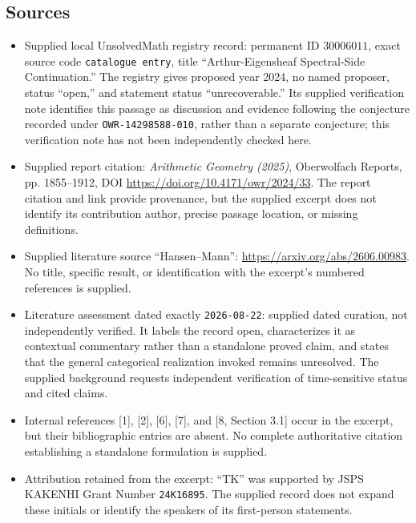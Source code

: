 \documentclass[11pt]{article}
\begin{document}
\subsection{Sources}
\begin{itemize}
\item Supplied local UnsolvedMath registry record: permanent ID \(30006011\), exact source code \texttt{catalogue entry}, title ``Arthur-Eigensheaf Spectral-Side Continuation.'' The registry gives proposed year 2024, no named proposer, status ``open,'' and statement status ``unrecoverable.'' Its supplied verification note identifies this passage as discussion and evidence following the conjecture recorded under \texttt{OWR-14298588-010}, rather than a separate conjecture; this verification note has not been independently checked here.
\item Supplied report citation: \emph{Arithmetic Geometry (2025)}, Oberwolfach Reports, pp. 1855--1912, DOI \url{https://doi.org/10.4171/owr/2024/33}. The report citation and link provide provenance, but the supplied excerpt does not identify its contribution author, precise passage location, or missing definitions.
\item Supplied literature source ``Hansen--Mann'': \url{https://arxiv.org/abs/2606.00983}. No title, specific result, or identification with the excerpt's numbered references is supplied.
\item Literature assessment dated exactly \texttt{2026-08-22}: supplied dated curation, not independently verified. It labels the record open, characterizes it as contextual commentary rather than a standalone proved claim, and states that the general categorical realization invoked remains unresolved. The supplied background requests independent verification of time-sensitive status and cited claims.
\item Internal references [1], [2], [6], [7], and [8, Section 3.1] occur in the excerpt, but their bibliographic entries are absent. No complete authoritative citation establishing a standalone formulation is supplied.
\item Attribution retained from the excerpt: ``TK'' was supported by JSPS KAKENHI Grant Number \texttt{24K16895}. The supplied record does not expand these initials or identify the speakers of its first-person statements.
\end{itemize}
\end{document}
